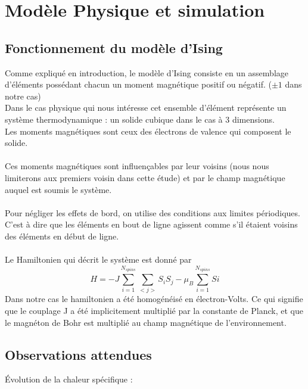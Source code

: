 \section{Modèle Physique et simulation}


\subsection{Fonctionnement du modèle d'Ising}

Comme expliqué en introduction, le modèle d'Ising consiste en un assemblage d'éléments possédant chacun un moment magnétique positif ou négatif. ($\pm 1$ dans notre cas)\\

Dans le cas physique qui nous intéresse cet ensemble d'élément représente un système thermodynamique : un solide cubique dans le cas à 3 dimensions.\\
Les moments magnétiques sont ceux des électrons de valence qui composent le solide.\\
\\
Ces moments magnétiques sont influençables par leur voisins (nous nous limiterons aux premiers voisin dans cette étude) et par le champ magnétique auquel est soumis le système.\\
\\
Pour négliger les effets de bord, on utilise des conditions aux limites périodiques. C'est à dire que les éléments en bout de ligne agissent comme s'il étaient voisins des éléments en début de ligne.\\
\\
Le Hamiltonien qui décrit le système est donné par
\begin{equation}
H = -J \sum_{i=1}^{N_{spins}} \sum_{<j>}^{} S_{i}S_{j} - \mu_{B} \sum_{i=1}^{N_{spins}} Si
\end{equation}
Dans notre cas le hamiltonien a été homogénéisé en électron-Volts. Ce qui signifie que le couplage J a été implicitement multiplié par la constante de Planck, et que le magnéton de Bohr est multiplié au champ magnétique de l'environnement.



\subsection{Observations attendues}
Évolution de la chaleur spécifique :\\




